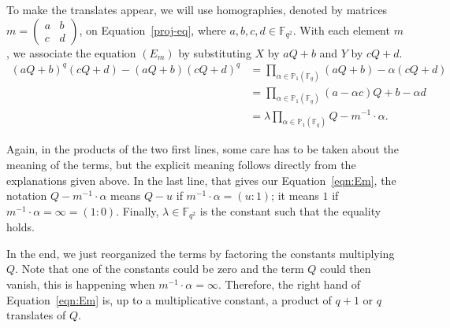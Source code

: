 \documentclass[a4paper,11pt]{article}
\theoremstyle{break}
\theoremstyle{sc}
\theoremstyle{definition}
\theoremstyle{remark}
\begin{document}
To make the translates appear, we will use homographies, denoted by
matrices $m=\begin{pmatrix} a&b\\c&d\end{pmatrix}$, on
Equation~\eqref{proj-eq}, where $a, b, c, d\in\mathbb{F}_{q^2}$. With each element $m$, we associate the equation
$(E_m)$ by substituting $X$ by $aQ+b$ and $Y$ by $cQ+d$.
\begin{align}
  (aQ+b)^q(cQ+d)-(aQ+b)(cQ+d)^q &=
  \prod_{\alpha\in\mathbb{P}_1(\mathbb{F}_q)}(aQ+b)-\alpha(cQ+d)\nonumber\\
  &= \prod_{\alpha\in\mathbb{P}_1(\mathbb{F}_q)}(a-\alpha c)Q+b-\alpha
  d\nonumber\\
  \label{eqn:Em}
  \tag{$E_m$}
  &=
  \lambda\prod_{\alpha\in\mathbb{P}_1(\mathbb{F}_q)}Q-m^{-1}\cdot\alpha.
\end{align}

Again, in the products of the two first lines, some care has to be taken about
the meaning of the terms, but the explicit meaning
follows directly from the explanations given
above. In the last line, that gives our Equation~\eqref{eqn:Em}, the notation
$Q-m^{-1}\cdot\alpha$ means $Q-u$ if $m^{-1}\cdot\alpha=(u:1)$; it
means $1$ if $m^{-1}\cdot\alpha=\infty=(1:0)$.
Finally, $\lambda\in\mathbb{F}_{q^2}$ is the constant such that the equality
holds.

In the end, we just reorganized the terms by factoring the constants multiplying $Q$.
Note that one of the constants could be zero and the term $Q$ could then vanish,
this is happening when $m^{-1}\cdot\alpha=\infty$. Therefore, the right hand of
Equation~\eqref{eqn:Em} is, up to a multiplicative constant, a product of $q+1$ or $q$
translates of $Q$.
\end{document}
